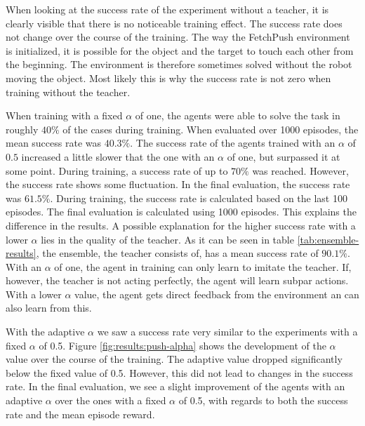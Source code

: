 When looking at the success rate of the experiment without a teacher, it is clearly visible that there is no noticeable training effect. The success rate does not change over the course of the training. The way the FetchPush environment is initialized, it is possible for the object and the target to touch each other from the beginning. The environment is therefore sometimes solved without the robot moving the object. Most likely this is why the success rate is not zero when training without the teacher.

When training with a fixed $\alpha$ of one, the agents were able to solve the task in roughly $40\%$ of the cases during training. When evaluated over 1000 episodes, the mean success rate was $40.3\%$. The success rate of the agents trained with an $\alpha$ of $0.5$ increased a little slower that the one with an $\alpha$ of one, but surpassed it at some point. During training, a success rate of up to $70\%$ was reached. However, the success rate shows some fluctuation. In the final evaluation, the success rate was $61.5\%$. During training, the success rate is calculated based on the last 100 episodes. The final evaluation is calculated using 1000 episodes. This explains the difference in the results. A possible explanation for the higher success rate with a lower $\alpha$ lies in the quality of the teacher. As it can be seen in table \ref{tab:ensemble-results}, the ensemble, the teacher consists of, has a mean success rate of $90.1\%$. With an $\alpha$ of one, the agent in training can only learn to imitate the teacher. If, however, the teacher is not acting perfectly, the agent will learn subpar actions. With a lower $\alpha$ value, the agent gets direct feedback from the environment an can also learn from this.

With the adaptive $\alpha$ we saw a success rate very similar to the experiments with a fixed $\alpha$ of 0.5. Figure \ref{fig:results:push-alpha} shows the development of the $\alpha$ value over the course of the training. The adaptive value dropped significantly below the fixed value of 0.5. However, this did not lead to changes in the success rate. In the final evaluation, we see a slight improvement of the agents with an adaptive $\alpha$ over the ones with a fixed $\alpha$ of 0.5, with regards to both the success rate and the mean episode reward.

